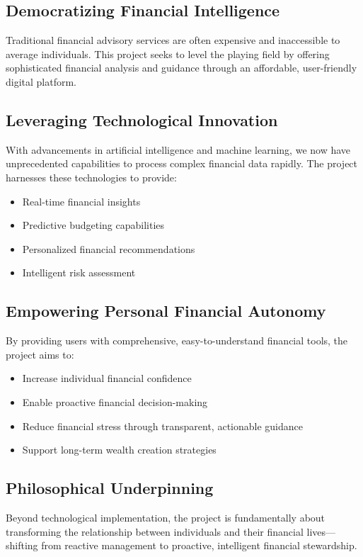 \subsection{Democratizing Financial Intelligence}
Traditional financial advisory services are often expensive and inaccessible to average individuals. This project seeks to level the playing field by offering sophisticated financial analysis and guidance through an affordable, user-friendly digital platform.

\subsection{Leveraging Technological Innovation}
With advancements in artificial intelligence and machine learning, we now have unprecedented capabilities to process complex financial data rapidly. The project harnesses these technologies to provide:
\begin{itemize}
    \item Real-time financial insights
    \item Predictive budgeting capabilities
    \item Personalized financial recommendations
    \item Intelligent risk assessment
\end{itemize}

\subsection{Empowering Personal Financial Autonomy}
By providing users with comprehensive, easy-to-understand financial tools, the project aims to:
\begin{itemize}
    \item Increase individual financial confidence
    \item Enable proactive financial decision-making
    \item Reduce financial stress through transparent, actionable guidance
    \item Support long-term wealth creation strategies
\end{itemize}


\subsection{Philosophical Underpinning}
Beyond technological implementation, the project is fundamentally about transforming the relationship between individuals and their financial lives—shifting from reactive management to proactive, intelligent financial stewardship.

